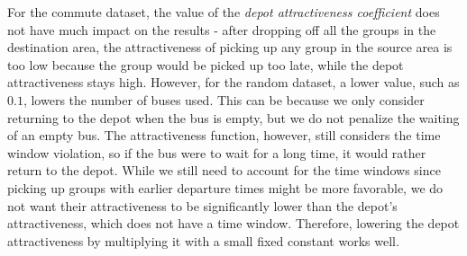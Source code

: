 For the commute dataset, the value of the \textit{depot attractiveness coefficient} does not have much impact on the results - after dropping off all the groups in the destination area, the attractiveness of picking up any group in the source area is too low because the group would be picked up too late, while the depot attractiveness stays high. However, for the random dataset, a lower value, such as $0.1$, lowers the number of buses used. This can be because we only consider returning to the depot when the bus is empty, but we do not penalize the waiting of an empty bus. The attractiveness function, however, still considers the time window violation, so if the bus were to wait for a long time, it would rather return to the depot. While we still need to account for the time windows since picking up groups with earlier departure times might be more favorable, we do not want their attractiveness to be significantly lower than the depot's attractiveness, which does not have a time window. Therefore, lowering the depot attractiveness by multiplying it with a small fixed constant works well.

